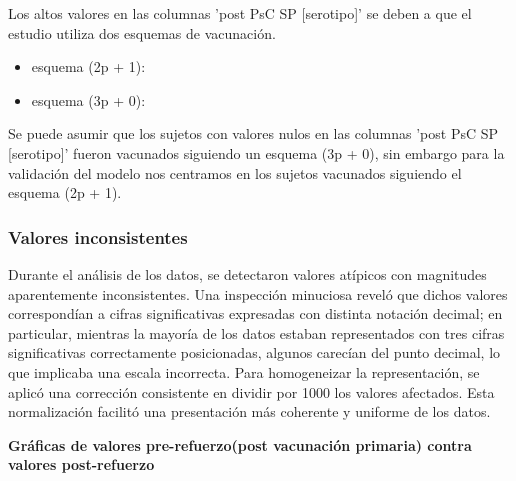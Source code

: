 \begin{figure}[h]
\begin{minipage}{0.45\textwidth}
        \caption{}
        \label{fig:mdp}
    \end{minipage}

\end{figure}



Los altos valores en las columnas 'post PsC SP [serotipo]' se deben a que el estudio utiliza dos esquemas de vacunación.
\begin{itemize}
    \item esquema (2p + 1): 
    \item esquema (3p + 0):
\end{itemize}
Se puede asumir que los sujetos con valores nulos en las columnas 'post PsC SP [serotipo]' fueron vacunados siguiendo un esquema (3p + 0), sin embargo para la validación del modelo nos centramos en los sujetos vacunados siguiendo el esquema (2p + 1).

\subsubsection{Valores inconsistentes}
Durante el análisis de los datos, se detectaron valores atípicos con magnitudes aparentemente inconsistentes. Una inspección minuciosa reveló que dichos valores correspondían a cifras significativas expresadas con distinta notación decimal; en particular, mientras la mayoría de los datos estaban representados con tres cifras significativas correctamente posicionadas, algunos carecían del punto decimal, lo que implicaba una escala incorrecta. Para homogeneizar la representación, se aplicó una corrección consistente en dividir por 1000 los valores afectados. Esta normalización facilitó una presentación más coherente y uniforme de los datos.

\vspace{0.5cm}

\textbf{Gráficas de valores pre-refuerzo(post vacunación primaria) contra valores post-refuerzo}

